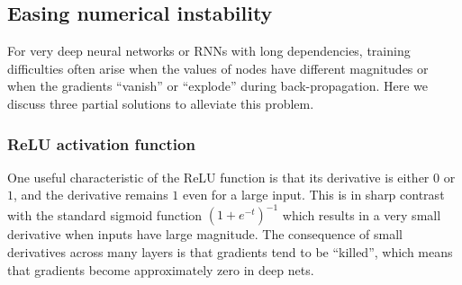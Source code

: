 \subsection{Easing numerical instability}\label{sec:batch-norm}


For very deep neural networks or RNNs with long dependencies, training difficulties often arise when the values of nodes have different magnitudes or when the gradients ``vanish'' or ``explode'' during back-propagation. Here we discuss three partial solutions to alleviate this problem.

\subsubsection{ReLU activation function}

One useful characteristic of the ReLU function is that its derivative is either $0$ or $1$, and the derivative remains $1$ even for a large input. This is in sharp contrast with the standard sigmoid function $(1 + e^{-t})^{-1}$ which results in a very small derivative when inputs have large magnitude. The consequence of small derivatives across many layers is that gradients tend to be ``killed'', which means that gradients become approximately zero in deep nets. %

